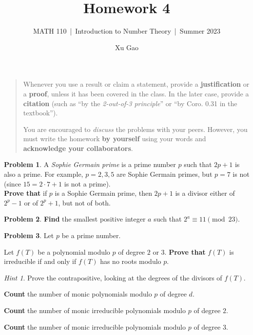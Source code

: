 \documentclass[11pt]{article}
\title{Homework 4}
\author{Xu Gao}
\subtitle{MATH 110~|~Introduction to Number Theory~|~Summer 2023}
\date{}
\theoremstyle{plain}
\theoremstyle{definition}
\newtheorem{problem}{Problem}
\theoremstyle{remark}
\newtheorem*{hint}{Hint}
\numberwithin{equation}{problem}
\begin{document}
\maketitle

\begin{quotation}
  Whenever you use a result or claim a statement, provide a \textbf{justification} or a \textbf{proof}, unless it has been covered in the class. In the later case, provide a \textbf{citation} (such as ``by the \emph{2-out-of-3 principle}'' or ``by Coro. 0.31 in the textbook'').

  You are encouraged to \emph{discuss} the problems with your peers. However, you must write the homework \textbf{by yourself} using your words and \textbf{acknowledge your collaborators}.
\end{quotation}



\begin{problem}
  A \emph{Sophie Germain prime} is a prime number $p$ such that $2p + 1$ is also a prime. For example, $p = 2, 3, 5$ are Sophie Germain primes, but $p = 7$ is not (since $15 = 2\cdot 7 + 1$ is not a prime).\\
  \textbf{Prove that} if $p$ is a Sophie Germain prime, then $2p + 1$ is a divisor either of $2^p - 1$ or of $2^p + 1$, but not of both.
\end{problem}

\begin{problem}\label{Problem 14.2}
  \textbf{Find} the smallest positive integer $a$ such that $2^a \equiv 11 \pmod{23}$.
\end{problem}

\begin{problem}
	Let $p$ be a prime number. 
	\begin{listinprob}
		\item Let $f(T)$ be a polynomial modulo $p$ of degree $2$ or $3$. \textbf{Prove that} $f(T)$ is irreducible if and only if $f(T)$ has no roots modulo $p$.
		\begin{hint}
			Prove the contrapositive, looking at the degrees of the divisors of $f(T)$.
		\end{hint}
		\item \textbf{Count} the number of monic polynomials modulo $p$ of degree $d$.
		\item \textbf{Count} the number of monic irreducible polynomials modulo $p$ of degree $2$.
		\item \textbf{Count} the number of monic irreducible polynomials modulo $p$ of degree $3$.
	\end{listinprob}	
\end{problem}
\end{document}
